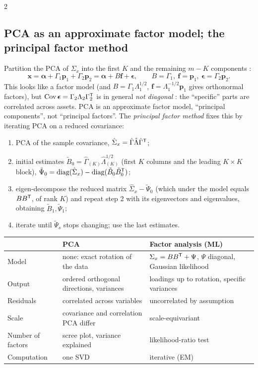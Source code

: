 \begin{paracol}{2}
\subsection{PCA as an approximate factor model; the principal factor method}\label{ch07:sec-pcafa}
Partition the PCA of $\Sigma_x$ into the first $K$ and the remaining $m-K$ components :
\[
  \bm x=\bm\alpha+\Gamma_1\bm p_1+\Gamma_2\bm p_2=\bm\alpha+B\bm f+\bm\epsilon,\qquad B=\Gamma_1,\ \bm f=\bm p_1,\ \bm\epsilon=\Gamma_2\bm p_2 .
\]
This looks like a factor model (and $B=\Gamma_1\Lambda_1^{1/2}$, $\bm f=\Lambda_1^{-1/2}\bm p_1$ gives orthonormal factors), but
$\operatorname{Cov}\bm\epsilon=\Gamma_2\Lambda_2\Gamma_2^{\mathsf T}$ is in general \emph{not diagonal} : the ``specific'' parts are
correlated across assets. PCA is an approximate factor model, ``principal components'', not ``principal
factors''. The \emph{principal factor method} fixes this by iterating PCA on a reduced covariance:
\begin{enumerate}[1.]
  \item PCA of the sample covariance, $\hat\Sigma_x=\hat\Gamma\hat\Lambda\hat\Gamma^{\mathsf T}$;
  \item initial estimates $\tilde B_0=\hat\Gamma_{(K)}\hat\Lambda_{(K)}^{1/2}$ (first $K$ columns and the leading $K\times K$ block),
        $\tilde\Psi_0=\operatorname{diag}(\hat\Sigma_x)-\operatorname{diag}(\tilde B_0\tilde B_0^{\mathsf T})$;
  \item eigen-decompose the reduced matrix $\hat\Sigma_x-\tilde\Psi_0$ (which under the model equals $BB^{\mathsf T}$, of rank $K$) and
        repeat step 2 with its eigenvectors and eigenvalues, obtaining $\tilde B_1,\tilde\Psi_1$;
  \item iterate until $\tilde\Psi_s$ stops changing; use the last estimates.
\end{enumerate}

\begin{center}\small
\begin{tabularx}{\linewidth}{@{}l X X@{}}
\toprule
 & \textbf{PCA} & \textbf{Factor analysis (ML)}\\
\midrule
Model & none: exact rotation of the data & $\Sigma_x=BB^{\mathsf T}+\Psi$, $\Psi$ diagonal, Gaussian likelihood\\
Output & ordered orthogonal directions, variances & loadings up to rotation, specific variances\\
Residuals & correlated across variables & uncorrelated by assumption\\
Scale & covariance and correlation PCA differ & scale-equivariant\\
Number of factors & scree plot, variance explained & likelihood-ratio test\\
Computation & one SVD & iterative (EM)\\
\bottomrule
\end{tabularx}
\end{center}


\end{paracol}
